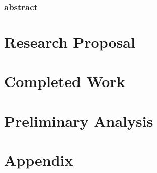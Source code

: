 \documentclass[onecolumn,fleqn,12pt,openany]{book}
\begin{document}
\section*{abstract}

\newpage

{\footnotesize \tableofcontents}
\newpage



\part{Research Proposal}





\part{Completed Work}


\part{Preliminary Analysis}



\part{Appendix}
\appendix
%
%

 

\end{document}
